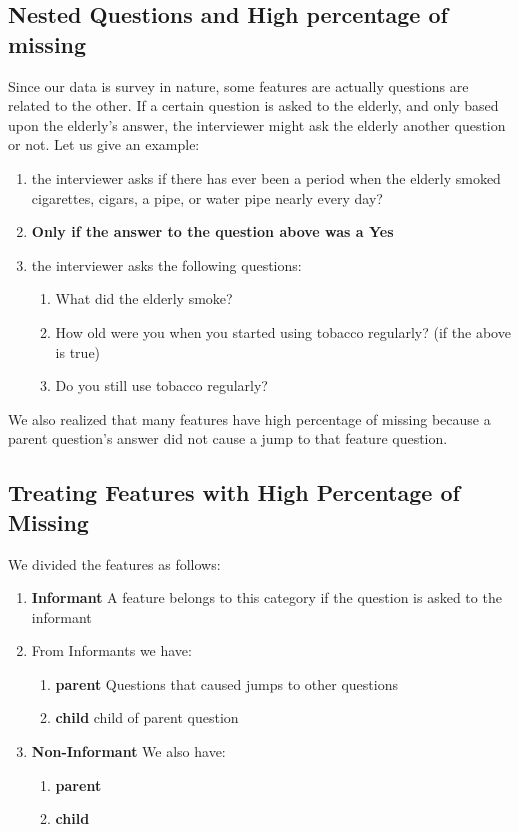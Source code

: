 \documentclass{article}
\begin{document}
\subsection{Nested Questions and High percentage of missing}
Since our data is survey in nature, some features are actually questions are related to the other. If a certain question is asked to the elderly, and only based upon the elderly's answer, the interviewer might ask the elderly another question or not. Let us give an example:
\begin{enumerate}
\item the interviewer asks if there has ever been a period when the elderly smoked cigarettes, cigars, a pipe, or water pipe nearly every day?

\item \textbf{Only if the answer to the question above was a Yes}

\item the interviewer asks the following questions:
\begin{enumerate}
\item What did the elderly smoke?
\item How old were you when you started using tobacco regularly? (if the above is true)
\item Do you still use tobacco regularly?
\end{enumerate}
\end{enumerate}

We also realized that many features have high percentage of missing because a parent question's answer did not cause a jump to that feature question.


\subsection{Treating Features with High Percentage of Missing}
\label{sec:legalizingfeatures}
We divided the features as follows:
\begin{enumerate}
\item \textbf{Informant} A feature belongs to this category if the question is asked to the informant

\item From Informants we have:
\begin{enumerate}
\item \textbf{parent} Questions that caused jumps to other questions

\item \textbf{child} child of parent question
\end{enumerate}

\item \textbf{Non-Informant}
We also have:
\begin{enumerate}
\item \textbf{parent}
\item \textbf{child}
\end{enumerate}
\end{enumerate}
\end{document}
